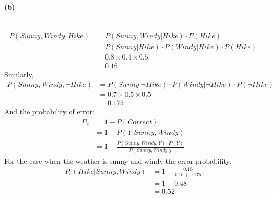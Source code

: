 \documentclass[a4paper]{article}
\begin{document}
\paragraph{(b)} ~\\
	\begin{align}
		P(Sunny, Windy, Hike) &= P(Sunny, Windy | Hike) \cdot P(Hike)\\
			&= P(Sunny | Hike) \cdot P(Windy | Hike) \cdot P(Hike)\\
			&= 0.8 \times 0.4 \times 0.5\\
			&= 0.16
	\end{align}
	Similarly,
	\begin{align}
		P(Sunny, Windy, \neg Hike) &= P(Sunny | \neg Hike) \cdot P(Windy | \neg Hike) \cdot P(\neg Hike)\\
			&= 0.7 \times 0.5 \times 0.5\\
			&= 0.175
	\end{align}
	And the probability of error:
	\begin{align}
		P_e &= 1 - P(Correct) \\
			&= 1 - P(Y|Sunny, Windy) \\
			&= 1 - \frac{P(Sunny, Windy, Y) \cdot P(Y)}{P(Sunny, Windy)}
	\end{align}
	For the case when the weather is sunny and windy the error probability:
	\begin{align}
		P_e(Hike|Sunny, Windy) &= 1 - \frac{0.16}{0.16 + 0.175} \\
			&= 1 - 0.48 \\
			&= 0.52
	\end{align}
\end{document}
